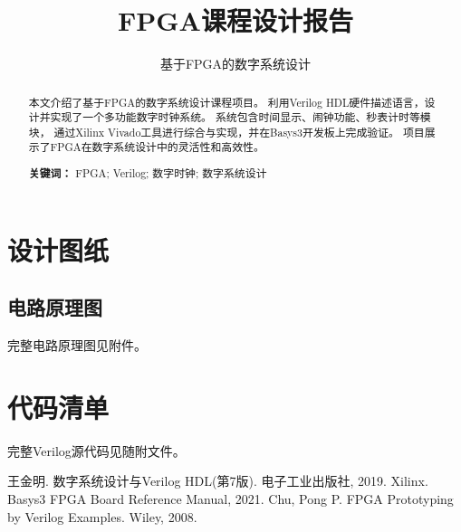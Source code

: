 \documentclass[12pt, a4paper]{ctexart}
\title{FPGA课程设计报告}
\subtitle{基于FPGA的数字系统设计}
\begin{document}
\makecover


\newpage
\begin{abstract}
本文介绍了基于FPGA的数字系统设计课程项目。
利用Verilog HDL硬件描述语言，设计并实现了一个多功能数字时钟系统。
系统包含时间显示、闹钟功能、秒表计时等模块，
通过Xilinx Vivado工具进行综合与实现，并在Basys3开发板上完成验证。
项目展示了FPGA在数字系统设计中的灵活性和高效性。
\par
\textbf{关键词：} FPGA; Verilog; 数字时钟; 数字系统设计
\end{abstract}

\tableofcontents
\clearpage

\setcounter{page}{1} %










\appendix
\section{\centering 设计图纸}
\subsection*{电路原理图}
完整电路原理图见附件。

\section{\centering 代码清单}
完整Verilog源代码见随附文件。

\begin{thebibliography}{99}
 王金明. 数字系统设计与Verilog HDL(第7版). 电子工业出版社, 2019.
 Xilinx. Basys3 FPGA Board Reference Manual, 2021.
 Chu, Pong P. FPGA Prototyping by Verilog Examples. Wiley, 2008.
\end{thebibliography}
\end{document}
